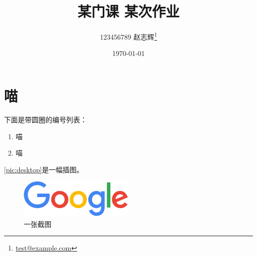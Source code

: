 \documentclass{dreamClass}
\title{\heiti\textbf{某门课 \quad 某次作业}}
\author{123456789 赵志辉\thanks{\href{mailto:test@example.com}{test@example.com}}}
\affil{九乡河文理学院}
\date{\today}
\begin{document}
\maketitle
\thispagestyle{empty}

\section{喵}
下面是带圆圈的编号列表：
\begin{enumerate}[label=\large\protect\textcircled{\small\arabic*}]
    \item 喵
    \item 喵
\end{enumerate}

\autoref{pic:desktop}是一幅插图。
\begin{figure}[H]
    \centering
    \includegraphics[width = 0.5\textwidth]{pic/screenshot.jpg}
    \caption{一张截图}\label{pic:desktop}
\end{figure}
\end{document}
